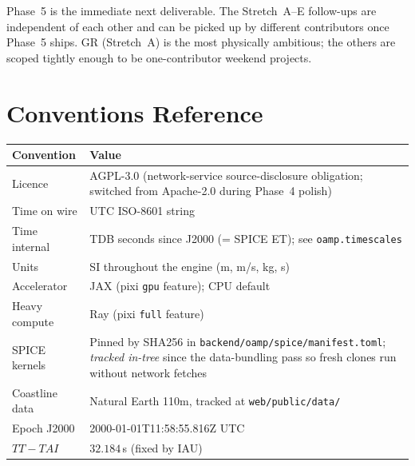 \documentclass[11pt, a4paper]{article}
\begin{document}
Phase~5 is the immediate next deliverable.  The Stretch~A--E follow-ups are
independent of each other and can be picked up by different contributors
once Phase~5 ships.  GR (Stretch~A) is the most physically ambitious; the
others are scoped tightly enough to be one-contributor weekend projects.

\section{Conventions Reference}

\begin{center}
\begin{tabularx}{\textwidth}{L{3cm} X}
  \toprule
  \textbf{Convention} & \textbf{Value} \\
  \midrule
  Licence        & AGPL-3.0 (network-service source-disclosure obligation; switched from Apache-2.0 during Phase~4 polish) \\
  Time on wire   & UTC ISO-8601 string \\
  Time internal  & TDB seconds since J2000 (= SPICE ET); see \texttt{oamp.timescales} \\
  Units          & SI throughout the engine (m, m/s, kg, s) \\
  Accelerator    & JAX (pixi \texttt{gpu} feature); CPU default \\
  Heavy compute  & Ray (pixi \texttt{full} feature) \\
  SPICE kernels  & Pinned by SHA256 in \texttt{backend/oamp/spice/manifest.toml}; \emph{tracked in-tree} since the data-bundling pass so fresh clones run without network fetches \\
  Coastline data & Natural Earth 110m, tracked at \texttt{web/public/data/} \\
  Epoch J2000    & 2000-01-01T11:58:55.816Z UTC \\
  $TT - TAI$     & $32.184\,$s (fixed by IAU) \\
  \bottomrule
\end{tabularx}
\end{center}
\end{document}

